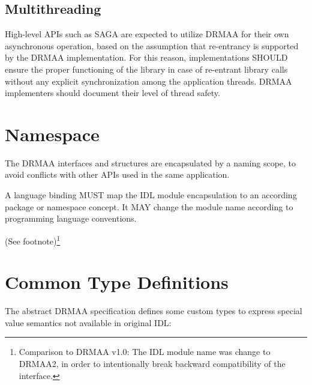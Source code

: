 \documentclass{article}
\newcommand{\langbind}[1]{\begin{shaded}#1\end{shaded}}
\newcommand{\rat}[1]{ {\tiny(See footnote)}\footnote{#1} }
\begin{document}
\subsection{Multithreading}

High-level APIs such as SAGA \cite{saga} are expected to utilize DRMAA for their own asynchronous operation, based on the assumption that re-entrancy is supported by the DRMAA implementation. For this reason, implementations SHOULD ensure the proper functioning of the library in case of re-entrant library calls without any explicit synchronization among the application threads. DRMAA implementers should document their level of thread safety. 

\section{Namespace}

The DRMAA interfaces and structures are encapsulated by a naming scope, to avoid conflicts with other APIs used in the same application. 



\langbind{
A language binding MUST map the IDL module encapsulation to an according package or namespace concept. It MAY change the module name according to programming language conventions.
}

\rat{
Comparison to DRMAA v1.0: The IDL module name was change to DRMAA2, in order to intentionally break backward compatibility of the interface.
}

\section{Common Type Definitions}
\label{sec:types}

The abstract DRMAA specification defines some custom types to express special value semantics not available in original IDL: 


\end{document}
